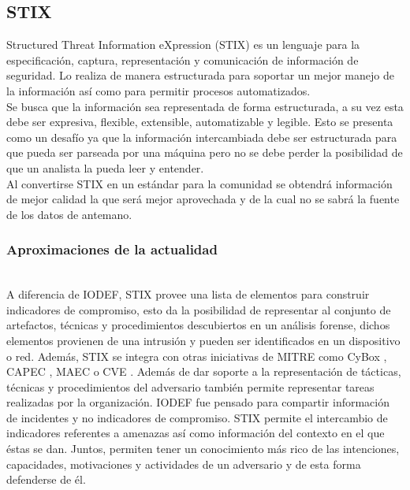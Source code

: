 \subsection{STIX}

Structured Threat Information eXpression (STIX) es un lenguaje para la especificación, captura, representación y 
comunicación de información de seguridad. Lo realiza de manera 
estructurada para soportar un mejor manejo de la información así como para 
permitir procesos automatizados.\\

Se busca que la información sea representada de forma estructurada, a su vez 
esta debe ser expresiva, flexible, extensible, automatizable y legible. Esto se 
presenta como un desafío ya que la información intercambiada debe ser 
estructurada para que pueda ser parseada por una máquina pero no se debe perder 
la posibilidad de que un analista la pueda leer y entender.\\

Al convertirse STIX en un estándar para la comunidad se obtendrá información de 
mejor calidad la que será mejor aprovechada y de la cual no se sabrá la fuente 
de los datos de antemano.

\subsubsection{Aproximaciones de la actualidad}\ \\

A diferencia de IODEF, STIX provee una lista de elementos para construir 
indicadores de compromiso, esto da la posibilidad de representar al conjunto de artefactos, técnicas y procedimientos descubiertos en un análisis forense, dichos elementos provienen de una intrusión y pueden ser identificados en un dispositivo o red. Además, STIX se integra con otras iniciativas de MITRE como CyBox \cite{cybox}, CAPEC \cite{capec}, MAEC \cite{maec} o CVE \cite{cve}. Además de dar soporte a la representación de tácticas, técnicas y procedimientos del adversario también permite representar tareas 
realizadas por la organización. IODEF fue pensado para compartir información de 
incidentes y no indicadores de compromiso. STIX permite el intercambio de 
indicadores referentes a amenazas así como información del contexto en el que 
éstas se dan. Juntos, permiten tener un conocimiento más rico de las 
intenciones, capacidades, motivaciones y actividades de un adversario y de esta 
forma defenderse de él.\\

